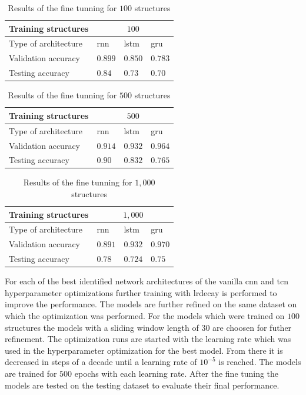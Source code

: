 \documentclass[conference]{IEEEtran}
\begin{document}
\begin{table}[htp]
	\centering
	\caption{Results of the fine tunning for $ 100 $ structures}
	\label{tab:results_fine_tuning_100_rnn}
	\begin{tabular}{p{2.5cm}|lll}
		Training structures & \multicolumn{3}{c}{$ 100 $} \\
		\hline
		Type of architecture & \gls{rnn} & \gls{lstm} & \gls{gru}\\
		\hline
		Validation accuracy & $0.899$ & $0.850$ & $0.783$\\
		\hline
		Testing accuracy & $0.84$ & $0.73$ & $0.70$
	\end{tabular}
\end{table}


\begin{table}[htp]
	\centering
	\caption{Results of the fine tunning for $ 500 $ structures}
	\label{tab:results_fine_tuning_500_rnn}
	\begin{tabular}{p{2.5cm}|lll}
		Training structures & \multicolumn{3}{c}{$ 500 $} \\
		\hline
		Type of architecture & \gls{rnn} & \gls{lstm} & \gls{gru}\\
		\hline
		Validation accuracy & $0.914$ & $0.932$ & $0.964$\\
		\hline
		Testing accuracy & $0.90$ & $0.832$ & $0.765$
	\end{tabular}
\end{table}



\begin{table}[htp]
	\centering
	\caption{Results of the fine tunning for $ 1,000 $ structures}
	\label{tab:results_fine_tuning_1000_rnn}
	\begin{tabular}{p{2.5cm}|lll}
		Training structures & \multicolumn{3}{c}{$ 1,000 $} \\
		\hline
		Type of architecture & \gls{rnn} & \gls{lstm} & \gls{gru}\\
		\hline
		Validation accuracy & $0.891$ & $0.932$ & $0.970$\\
		\hline
		Testing accuracy & $0.78$ & $0.724$ & $0.75$
	\end{tabular}
\end{table}



For each of the best identified network architectures of the vanilla \gls{cnn} and \gls{tcn} hyperparameter optimizations further training with \gls{lrdecay} is performed to improve the performance. The models are further refined on the same dataset on which the optimization was performed. For the models which were trained on $ 100 $ structures the models with a sliding window length of $ 30 $ are choosen for futher refinement. The optimization runs are started with the learning rate which was used in the hyperparameter optimization for the best model. From there it is decreased in steps of a decade until a learning rate of $ 10^{-5} $ is reached. The models are trained for $ 500 $ epochs with each learning rate. After the fine tuning the models are tested on the testing dataset to evaluate their final performance.
\end{document}

